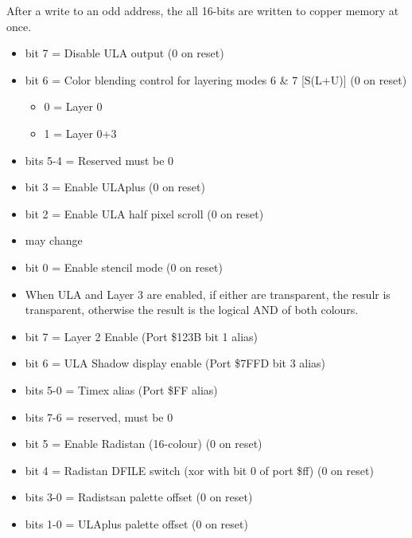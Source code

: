 After a write to an odd address, the all 16-bits are written to copper
memory at once.

\begin{itemize}
\item bit 7 = Disable ULA output (0 on reset)
\item bit 6 = Color blending control for layering modes 6 \& 7
  [S(L+U)] (0 on reset)
  \begin{itemize}
  \item 0 = Layer 0
  \item 1 = Layer 0+3
  \end{itemize}
\item bits 5-4 = Reserved must be 0
\item bit 3 = Enable ULAplus (0 on reset)
\item bit 2 = Enable ULA half pixel scroll (0 on reset)
\item[] may change
\item bit 0 = Enable stencil mode (0 on reset)
\item[] When ULA and Layer 3 are enabled, if either are transparent,
  the resulr is transparent, otherwise the result is the logical AND
  of both colours.
\end{itemize}

\begin{itemize}
\item bit 7 = Layer 2 Enable (Port \$123B bit 1 alias)
\item bit 6 = ULA Shadow display enable (Port \$7FFD bit 3 alias)
\item bits 5-0 = Timex alias (Port \$FF alias)
\end{itemize}

\begin{itemize}
\item bits 7-6 = reserved, must be 0
\item bit 5 = Enable Radistan (16-colour) (0 on reset)
\item bit 4 = Radistan DFILE switch (xor with bit 0 of port \$ff) (0
  on reset)
\item bits 3-0 = Radistsan palette offset (0 on reset)
\item bits 1-0 = ULAplus palette offset (0 on reset)
\end{itemize}

